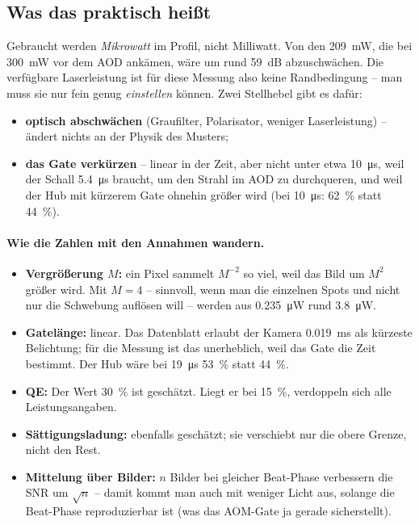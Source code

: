 \documentclass[11pt,a4paper]{article}
\begin{document}
\subsection*{Was das praktisch hei\ss{}t}

Gebraucht werden \emph{Mikrowatt} im Profil, nicht Milliwatt. Von den
\SI{209}{\milli\watt}, die bei \SI{300}{\milli\watt} vor dem AOD ank\"amen, w\"are
um rund \SI{59}{\deci\bel} abzuschw\"achen. Die verf\"ugbare Laserleistung ist f\"ur
diese Messung also keine Randbedingung -- man muss sie nur fein genug
\emph{einstellen} k\"onnen. Zwei Stellhebel gibt es daf\"ur:

\begin{itemize}
\item \textbf{optisch abschw\"achen} (Graufilter, Polarisator, weniger
  Laserleistung) -- \"andert nichts an der Physik des Musters;
\item \textbf{das Gate verk\"urzen} -- linear in der Zeit, aber nicht unter etwa
  \SI{10}{\micro\second}, weil der Schall \SI{5,4}{\micro\second} braucht, um den
  Strahl im AOD zu durchqueren, und weil der Hub mit k\"urzerem Gate ohnehin
  gr\"o\ss{}er wird (bei \SI{10}{\micro\second}: \SI{62}{\percent} statt
  \SI{44}{\percent}).
\end{itemize}

\paragraph{Wie die Zahlen mit den Annahmen wandern.}
\begin{itemize}
\item \textbf{Vergr\"o\ss{}erung $M$:} ein Pixel sammelt $M^{-2}$ so viel, weil das
  Bild um $M^2$ gr\"o\ss{}er wird. Mit $M=4$ -- sinnvoll, wenn man die einzelnen
  Spots und nicht nur die Schwebung aufl\"osen will -- werden aus
  \SI{0,235}{\micro\watt} rund \SI{3,8}{\micro\watt}.
\item \textbf{Gatel\"ange:} linear. Das Datenblatt erlaubt der Kamera
  \SI{0,019}{\milli\second} als k\"urzeste Belichtung; f\"ur die Messung ist das
  unerheblich, weil das Gate die Zeit bestimmt. Der Hub w\"are bei
  \SI{19}{\micro\second} \SI{53}{\percent} statt \SI{44}{\percent}.
\item \textbf{QE:} Der Wert \SI{30}{\percent} ist gesch\"atzt. Liegt er bei
  \SI{15}{\percent}, verdoppeln sich alle Leistungsangaben.
\item \textbf{S\"attigungsladung:} ebenfalls gesch\"atzt; sie verschiebt nur die
  obere Grenze, nicht den Rest.
\item \textbf{Mittelung \"uber Bilder:} $n$ Bilder bei gleicher Beat-Phase
  verbessern die SNR um $\sqrt{n}$ -- damit kommt man auch mit weniger Licht
  aus, solange die Beat-Phase reproduzierbar ist (was das AOM-Gate ja gerade
  sicherstellt).
\end{itemize}
\end{document}
